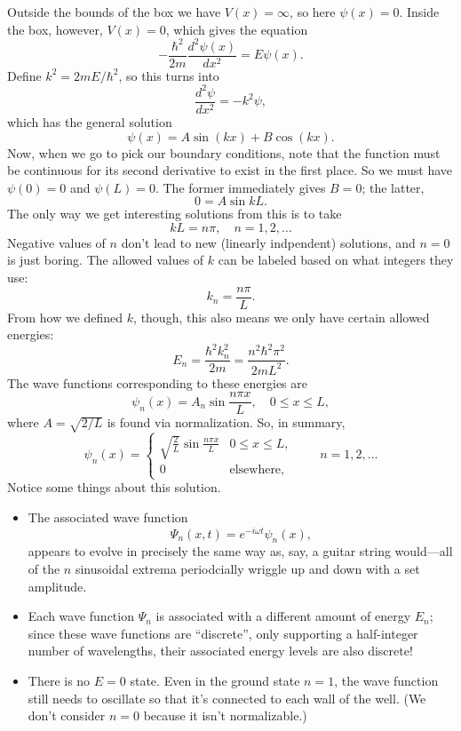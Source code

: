 \documentclass[../p052main.tex]{subfiles}
\begin{document}
Outside the bounds of the box we have $V(x) = \infty$, so here $\psi(x) = 0$.
Inside the box, however, $V(x) = 0$, which gives the equation
\[ -\frac{\hbar^2}{2m} \frac{d^2 \psi(x)}{dx^2} = E \psi (x). \]
Define $k^2 = 2mE / \hbar^2$, so this turns into
\[ \frac{d^2 \psi}{dx^2} = -k^2 \psi, \]
which has the general solution
\[ \psi(x) = A \sin (kx) + B \cos (kx). \]
Now, when we go to pick our boundary conditions, note that the function must be continuous for its second derivative to exist in the first place.
So we must have $\psi(0) = 0$ and $\psi(L) = 0$.
The former immediately gives $B = 0$; the latter,
\[ 0 = A \sin kL. \]
The only way we get interesting solutions from this is to take
\[ kL = n \pi, \quad n = 1, 2, \ldots \]
Negative values of $n$ don't lead to new (linearly indpendent) solutions, and $n = 0$ is just boring.
The allowed values of $k$ can be labeled based on what integers they use:
\[ k_n = \frac{n \pi}{L}. \]
From how we defined $k$, though, this also means we only have certain allowed energies:
\[ E_n = \frac{\hbar^2 k_n^2}{2m} = \frac{n^2 \hbar^2 \pi^2}{2mL^2}. \]
The wave functions corresponding to these energies are
\[ \psi_n(x) = A_n \sin \frac{n \pi x}{L}, \quad 0 \leq x \leq L, \]
where $A = \sqrt{2/L}$ is found via normalization.
So, in summary,
\[ \psi_n(x) = \begin{cases} \sqrt{\frac{2}{L}} \sin \frac{n \pi x}{L} & 0 \leq x \leq L, \\ 0 & \text{elsewhere}, \end{cases} \qquad n = 1, 2, \ldots \]
Notice some things about this solution.
\begin{itemize}
    \item The associated wave function
    \[ \Psi_n(x,t) = e^{-i \omega t} \psi_n(x), \]
    appears to evolve in precisely the same way as, say, a guitar string would---all of the $n$ sinusoidal extrema periodcially wriggle up and down with a set amplitude.
    \item Each wave function $\Psi_n$ is associated with a different amount of energy $E_n$; since these wave functions are ``discrete'', only supporting a half-integer number of wavelengths, their associated energy levels are also discrete!
    \item There is no $E = 0$ state.
    Even in the ground state $n=1$, the wave function still needs to oscillate so that it's connected to each wall of the well.
    (We don't consider $n=0$ because it isn't normalizable.)
\end{itemize}
\end{document}

